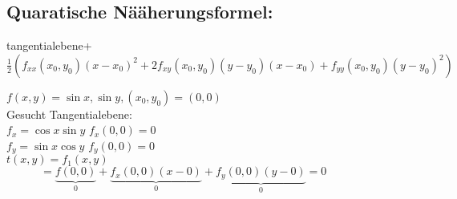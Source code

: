 \subsection{Quaratische Nääherungsformel:}
tangentialebene+$\frac{1}{2}(f_{xx}(x_0,y_0)(x-x_0)^2+2f_{xy}(x_0,y_0)(y-y_0)(x-x_0)+f_{yy}(x_0,y_0)(y-y_0)^2)
$
\begin{example}
	$f(x,y)=\sin x ,\sin y,(x_0,y_0)=(0,0)$\\Gesucht Tangentialebene:\\
	$f_x=\cos x \sin y $   $f_x(0,0)=0$\\
	$f_y=\sin x \cos y $ $f_y(0,0)=0$\\
	$t(x,y)=f_1(x,y)$\\ 
	$\qquad \quad =\underbrace{f(0,0)}_{0}+\underbrace{f_x(0,0)(x-0)}_{0}+\underbrace{f_y(0,0)(y-0)}_{0}=0$
\end{example}